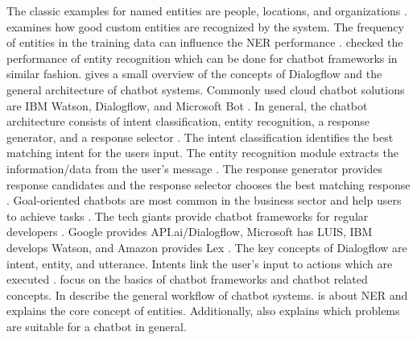 The classic examples for named entities are people, locations, and organizations \cite{geyer2016named}.
\citet{geyer2016named} examines how good custom entities are recognized by the system.
The frequency of entities in the training data can influence the NER performance \cite{geyer2016named}. 
\citet{geyer2016named} checked the performance of entity recognition which can be done for chatbot frameworks in similar fashion.
\citet{rahman2017programming} gives a small overview of the concepts of Dialogflow and the general architecture of chatbot systems.
Commonly used cloud chatbot solutions are IBM Watson, Dialogflow, and Microsoft Bot \cite{rahman2017programming}.
In general, the chatbot architecture consists of intent classification, entity recognition, a response generator, 
and a response selector \cite{rahman2017programming}. 
The intent classification identifies the best matching intent for the users input.
The entity recognition module extracts the information/data from the user's message \cite{rahman2017programming}.
The response generator provides response candidates and the response selector chooses the best matching response \cite{rahman2017programming}.
Goal-oriented chatbots are most common in the business sector and help users to achieve tasks \cite{rahman2017programming}.
The tech giants provide chatbot frameworks for regular developers \cite{rahman2017programming}.
Google provides API.ai/Dialogflow, Microsoft has LUIS, IBM develops Watson, and Amazon provides Lex \cite{rahman2017programming}.
The key concepts of Dialogflow are intent, entity, and utterance.
Intents link the user's input to actions which are executed \cite{rahman2017programming}.
\citet{deshpande2017survey,buiildChatbotsPython,geyer2016named,rahman2017programming} focus on the 
basics of chatbot frameworks and chatbot related concepts.
In \citet{deshpande2017survey, rahman2017programming} describe the general workflow of chatbot systems.
\citet{geyer2016named} is about NER and explains the core concept of entities.
Additionally, \citet{buiildChatbotsPython} also explains which problems are 
suitable for a chatbot in general.

